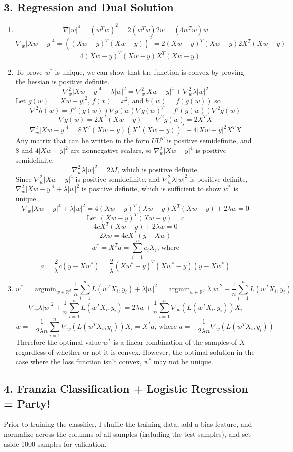 \documentclass{article}
\newcommand{\R}{\mathbb{R}}
\DeclareMathOperator*{\argmin}{argmin}
\begin{document}
\subsection*{3. Regression and Dual Solution}
\begin{enumerate}[label=\alph*)]
\item $$\nabla |w|^4=(w^Tw)^2=2(w^Tw)2w=(4w^Tw)w$$
$$\nabla_w |Xw-y|^4=((Xw-y)^T(Xw-y))^2=2(Xw-y)^T(Xw-y)2X^T(Xw-y)$$
$$=4(Xw-y)^T(Xw-y)X^T(Xw-y)$$

\item
To prove $w^*$ is unique, we can show that the function is convex by proving the hessian is positive definite.
$$\nabla_w^2|Xw-y|^4+\lambda|w|^2=\nabla_w^2|Xw-y|^4 + \nabla_w^2 \lambda|w|^2$$
Let $g(w)=|Xw-y|^2$, $f(x)=x^2$, and $h(w)=f(g(w))$ so
$$\nabla^2h(w)=f''(g(w))\nabla g(w)\nabla g(w)^T + f'(g(w))\nabla^2g(w)$$
$$\nabla g(w)=2X^T(Xw-y) \qquad \nabla^2g(w)=2X^TX$$
$$\nabla_w^2|Xw-y|^4=8 X^T(Xw-y)(X^T(Xw-y))^T+4|Xw-y|^2X^TX$$
Any matrix that can be written in the form $UU^T$ is positive semidefinite, and $8$ and $4|Xw-y|^2$ are nonnegative scalars, so $\nabla_w^2|Xw-y|^4$ is positive semidefinite.
$$\nabla_w^2\lambda|w|^2 = 2\lambda I\text{, which is positive definite.}$$
Since $\nabla_w^2|Xw-y|^4$ is positive semidefinite, and $\nabla_w^2\lambda|w|^2$ is positive definite, $\nabla_w^2|Xw-y|^4+\lambda|w|^2$ is positive definite, which is sufficient to show $w^*$ is unique.
$$\nabla_w |Xw-y|^4+\lambda|w|^2=4(Xw-y)^T(Xw-y)X^T(Xw-y)+2\lambda w=0$$
$$\text{Let }(Xw-y)^T(Xw-y)=c$$
$$4cX^T(Xw-y)+2\lambda w=0$$
$$2\lambda w = 4cX^T(y-Xw)$$
$$w^*=X^Ta=\sum_{i=1}^na_iX_i \text{, where}$$
$$a=\frac{2}{\lambda}c(y-Xw^*)=\frac{2}{\lambda}(Xw^*-y)^T(Xw^*-y)(y-Xw^*)$$
\item
$$w^*=\argmin_{w\in \R^d} \frac{1}{n}\sum_{i=1}^nL(w^TX_i,y_i)+\lambda|w|^2=\argmin_{w\in \R^d}\lambda|w|^2+\frac{1}{n}\sum_{i=1}^nL(w^TX_i,y_i)$$
$$\nabla_w\lambda|w|^2+\frac{1}{n}\sum_{i=1}^nL(w^TX_i,y_i)=2\lambda w+\frac{1}{n}\sum_{i=1}^n \nabla_w(L(w^TX_i,y_i))X_i$$
$$w=-\frac{1}{2\lambda n}\sum_{i=1}^n\nabla_w(L(w^TX_i,y_i))X_i=X^Ta\text{, where }a=-\frac{1}{2\lambda n}\nabla_w(L(w^TX_i,y_i))$$
Therefore the optimal value $w^*$ is a linear combination of the samples of $X$ regardless of whether or not it is convex. However, the optimal solution in the case where the loss function isn't convex, $w^*$ may not be unique.
\end{enumerate}

\newpage
\subsection*{4. Franzia Classification + Logistic Regression = Party!}
Prior to training the classifier, I shuffle the training data, add a bias feature, and normalize across the columns of all samples (including the test samples), and set aside 1000 samples for validation.
\end{document}
